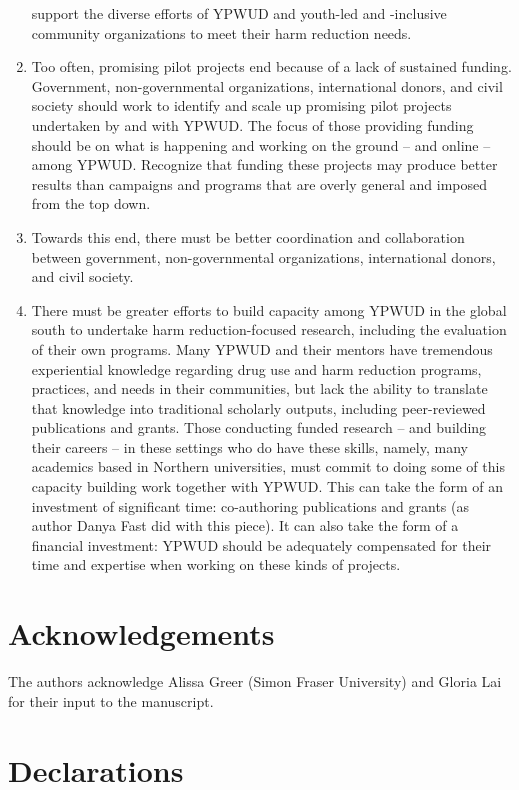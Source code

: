 \documentclass[
  letterpaper,
  DIV=11,
  numbers=noendperiod]{scrartcl}
\begin{document}
\begin{enumerate}
  support the diverse efforts of YPWUD and youth-led and -inclusive
  community organizations to meet their harm reduction needs.
\item
  Too often, promising pilot projects end because of a lack of sustained
  funding. Government, non-governmental organizations, international
  donors, and civil society should work to identify and scale up
  promising pilot projects undertaken by and with YPWUD. The focus of
  those providing funding should be on what is happening and working on
  the ground -- and online -- among YPWUD. Recognize that funding these
  projects may produce better results than campaigns and programs that
  are overly general and imposed from the top down.
\item
  Towards this end, there must be better coordination and collaboration
  between government, non-governmental organizations, international
  donors, and civil society.
\item
  There must be greater efforts to build capacity among YPWUD in the
  global south to undertake harm reduction-focused research, including
  the evaluation of their own programs. Many YPWUD and their mentors
  have tremendous experiential knowledge regarding drug use and harm
  reduction programs, practices, and needs in their communities, but
  lack the ability to translate that knowledge into traditional
  scholarly outputs, including peer-reviewed publications and grants.
  Those conducting funded research -- and building their careers -- in
  these settings who do have these skills, namely, many academics based
  in Northern universities, must commit to doing some of this capacity
  building work together with YPWUD. This can take the form of an
  investment of significant time: co-authoring publications and grants
  (as author Danya Fast did with this piece). It can also take the form
  of a financial investment: YPWUD should be adequately compensated for
  their time and expertise when working on these kinds of projects.
\end{enumerate}

\section{Acknowledgements}\label{acknowledgements}

The authors acknowledge Alissa Greer (Simon Fraser University) and
Gloria Lai for their input to the manuscript.

\section{Declarations}\label{declarations}
\end{document}
